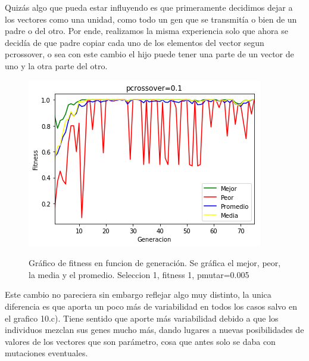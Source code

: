 \documentclass[A4paper,oneside,fleqn,11pt]{article}
\theoremstyle{definition}
\begin{document}
Quizás algo que pueda estar influyendo es que primeramente decidimos dejar a los vectores como una unidad, como todo un gen que se transmitía o bien de un padre o del otro. Por ende, realizamos la misma experiencia solo que ahora se decidía de que padre copiar cada uno de los elementos del vector segun pcrossover, o sea con este cambio el hijo puede tener una parte de un vector de uno y la otra parte del otro.

\begin{figure}[H]
	\captionsetup[subfigure]{position=b}
	\centering
		{\includegraphics[width=0.3\linewidth]{crossoverB1.png}}
	\caption{Gráfico de fitness en funcion de generación. Se gráfica el mejor, peor, la media y el promedio. Seleccion 1, fitness 1, pmutar=0.005}
\end{figure}

Este cambio no pareciera sin embargo reflejar algo muy distinto, la unica diferencia es que aporta un poco más de variabilidad en todos los casos salvo en el grafico 10.c). Tiene sentido que aporte más variabilidad debido a que los individuos mezclan sus genes mucho más, dando lugares a nuevas posibilidades de valores de los vectores que son parámetro, cosa que antes solo se daba con mutaciones eventuales.
\end{document}
